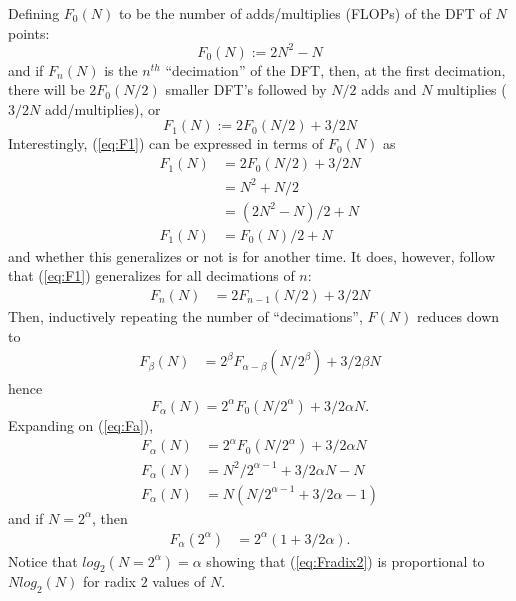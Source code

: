 \documentclass{article}
\begin{document}
Defining $F_0 (N)$ to be the number of adds/multiplies (FLOPs) of the DFT of $N$ points:
%
\begin {equation} \label {eq:F0}
F_0 (N) := 2 N^2 - N
\end {equation}
%
and if $F_n(N)$ is the $n^{th}$ ``decimation'' of the DFT, then, at the first decimation, there will be $2 F_0(N/2)$ smaller DFT's followed by $N/2$ adds and $N$ multiplies ($3/2 N$ add/multiplies), or
%
\begin {equation} \label {eq:F1}
F_1 (N) := 2 F_0 (N/2) + 3/2 N
\end {equation}
%
Interestingly, (\ref{eq:F1}) can be expressed in terms of $F_0(N)$ as
%
\begin {equation}
\begin {aligned}
F_1 (N) &= 2 F_0 (N/2) + 3/2 N \\
        &= N^2 + N/2 \\
        &= (2 N^2 - N)/2 + N \\
F_1 (N) &= F_0(N)/2 + N
\end {aligned}
\end {equation}
%
and whether this generalizes or not is for another time.
It does, however, follow that (\ref{eq:F1}) generalizes for all decimations of $n$:
%
\begin {equation} \label {eq:Fn}
\begin {aligned}
F_n (N) &= 2 F_{n - 1} (N/2) + 3/2 N
\end {aligned}
\end {equation}
%
Then, inductively repeating the number of ``decimations'', $F(N)$ reduces down to
%
\begin {equation} \label {eq:Fb}
\begin {aligned}
F_\beta (N) &= 2^\beta F_{\alpha - \beta} (N/2^\beta) + 3/2 \beta N
\end {aligned}
\end {equation}
%
hence
%
\begin {equation} \label {eq:Fa}
F_\alpha (N) = 2^\alpha F_0 (N/2^\alpha) + 3/2 \alpha N.
\end {equation}
%
Expanding on (\ref{eq:Fa}),
%
\begin {equation}
\begin {aligned}
F_\alpha (N) &= 2^\alpha F_0 (N/2^\alpha) + 3/2 \alpha N \\
F_\alpha (N) &= N^2/2^{\alpha - 1} + 3/2 \alpha N - N \\
F_\alpha (N) &= N (N/2^{\alpha - 1} + 3/2 \alpha - 1)
\end {aligned}
\end {equation}
%
and if $N = 2^\alpha$, then
%
\begin {equation} \label {eq:Fradix2}
\begin {aligned}
F_\alpha (2^\alpha) &= 2^{\alpha} (1 + 3/2 \alpha).
\end {aligned}
\end {equation}
%
Notice that $log_2 (N = 2^\alpha) = \alpha$ showing that (\ref{eq:Fradix2}) is proportional to $N log_2 (N)$ for radix $2$ values of $N$.
%
\end{document}
